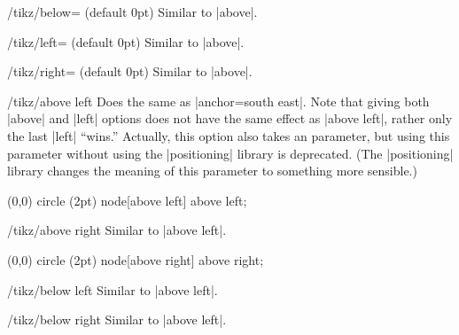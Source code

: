 \begin{key}{/tikz/below= (default 0pt)}
  Similar to |above|.
\end{key}

\begin{key}{/tikz/left= (default 0pt)}
  Similar to |above|.
\end{key}

\begin{key}{/tikz/right= (default 0pt)}
  Similar to |above|.
\end{key}

\begin{key}{/tikz/above left}
  Does the same as |anchor=south east|. Note that giving both |above|
  and |left| options does not have the same effect as |above left|,
  rather only the last |left| ``wins.'' Actually, this option also
  takes an  parameter, but using this parameter without
  using the |positioning| library is deprecated. (The |positioning|
  library changes the meaning of this parameter to something more
  sensible.)
\begin{codeexample}[]
\tikz \fill (0,0) circle (2pt) node[above left] {above left};
\end{codeexample}
\end{key}

\begin{key}{/tikz/above right}
  Similar to  |above left|.
\begin{codeexample}[]
\tikz \fill (0,0) circle (2pt) node[above right] {above right};
\end{codeexample}
\end{key}

\begin{key}{/tikz/below left}
  Similar to |above left|.
\end{key}
\begin{key}{/tikz/below right}
  Similar to |above left|.
\end{key}


